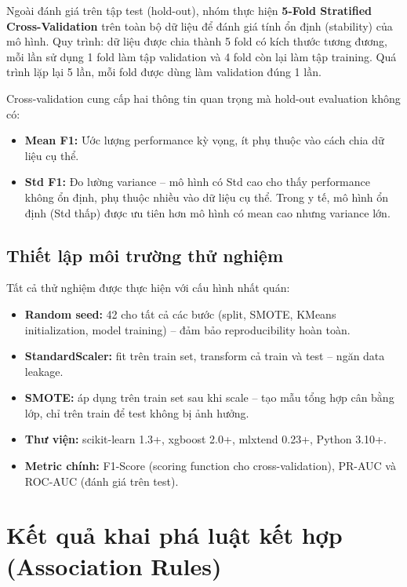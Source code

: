 Ngoài đánh giá trên tập test (hold-out), nhóm thực hiện \textbf{5-Fold Stratified Cross-Validation} trên toàn bộ dữ liệu để đánh giá tính ổn định (stability) của mô hình. Quy trình: dữ liệu được chia thành 5 fold có kích thước tương đương, mỗi lần sử dụng 1 fold làm tập validation và 4 fold còn lại làm tập training. Quá trình lặp lại 5 lần, mỗi fold được dùng làm validation đúng 1 lần.

Cross-validation cung cấp hai thông tin quan trọng mà hold-out evaluation không có:
\begin{itemize}
    \item \textbf{Mean F1:} Ước lượng performance kỳ vọng, ít phụ thuộc vào cách chia dữ liệu cụ thể.
    \item \textbf{Std F1:} Đo lường variance -- mô hình có Std cao cho thấy performance không ổn định, phụ thuộc nhiều vào dữ liệu cụ thể. Trong y tế, mô hình ổn định (Std thấp) được ưu tiên hơn mô hình có mean cao nhưng variance lớn.
\end{itemize}

\subsection{Thiết lập môi trường thử nghiệm}

Tất cả thử nghiệm được thực hiện với cấu hình nhất quán:
\begin{itemize}
    \item \textbf{Random seed:} 42 cho tất cả các bước (split, SMOTE, KMeans initialization, model training) -- đảm bảo reproducibility hoàn toàn.
    \item \textbf{StandardScaler:} fit trên train set, transform cả train và test -- ngăn data leakage.
    \item \textbf{SMOTE:} áp dụng trên train set sau khi scale -- tạo mẫu tổng hợp cân bằng lớp, chỉ trên train để test không bị ảnh hưởng.
    \item \textbf{Thư viện:} scikit-learn 1.3+, xgboost 2.0+, mlxtend 0.23+, Python 3.10+.
    \item \textbf{Metric chính:} F1-Score (scoring function cho cross-validation), PR-AUC và ROC-AUC (đánh giá trên test).
\end{itemize}

\section{Kết quả khai phá luật kết hợp (Association Rules)}


